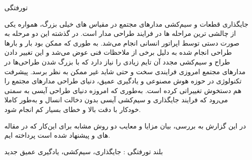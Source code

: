 

‌تورفتگی

جایگذاری قطعات و سیم‌کشی مدار‌های مجتمع در مقیاس های خیلی بزرگ، همواره یکی از چالشی ترین مراحله ها در فرایند طراحی مدار است. در گذشته این دو مرحله به صورت دستی توسط اپراتور انسانی انجام می‌شد. به طوری که ممکن بود بار و بارها طراحی انجام شده به دلیل برخی از ملاحظات فنی عوض می‌شد و این تغییر دادن طراح و سیم‌کشی مجدد آن تایم زیادی را نیاز دارد که با بزرگ شدن طراحی‌ها در مدار‌های مجتمع امروزی فرایندی سخت و حتی شاید غیر ممکن به نظر برسد. پیشرفت تکنولوژی در حوزه هوش مصنوعی و یادگیری عمیق، دنیای طراحی مدار‌های مجتمع را هم دستخوش تغییراتی کرده است. به‌طوری که امروزه دنیای طراحی آیسی به سمتی می‌رود که فرایند جایگذاری و سیم‌کشی آیسی بدون دخالت انسال و به‌طور کاملا خودکار با دقت بالا و خطای بسیار کم انجام شود.

در این گزارش به بررسی، بیان مزایا و معایب دو روش مشابه برای این‌کار که در مقاله های  و  پیشنهاد شده است پرداخته ایم.

‌بلند
‌تورفتگی : 
جایگذاری، سیم‌کشی، یادگیری عمیق
‌جدید
